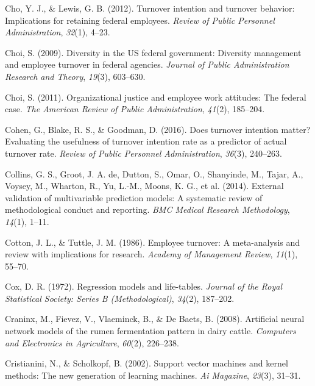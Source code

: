 \documentclass[
  man]{apa7}
\newlength{\cslhangindent}
\newlength{\cslentryspacingunit} %
\newenvironment{CSLReferences}[2] %
 {%
  \setlength{\parindent}{0pt}
  \ifodd #1
  \let\oldpar\par
  \def\par{\hangindent=\cslhangindent\oldpar}
  \fi
  \setlength{\parskip}{#2\cslentryspacingunit}
 }%
 {}
\begin{document}
\begin{CSLReferences}{1}{0}
\leavevmode{}%
Cho, Y. J., \& Lewis, G. B. (2012). Turnover intention and turnover behavior: Implications for retaining federal employees. \emph{Review of Public Personnel Administration}, \emph{32}(1), 4--23.

\leavevmode{}%
Choi, S. (2009). Diversity in the US federal government: Diversity management and employee turnover in federal agencies. \emph{Journal of Public Administration Research and Theory}, \emph{19}(3), 603--630.

\leavevmode{}%
Choi, S. (2011). Organizational justice and employee work attitudes: The federal case. \emph{The American Review of Public Administration}, \emph{41}(2), 185--204.

\leavevmode{}%
Cohen, G., Blake, R. S., \& Goodman, D. (2016). Does turnover intention matter? Evaluating the usefulness of turnover intention rate as a predictor of actual turnover rate. \emph{Review of Public Personnel Administration}, \emph{36}(3), 240--263.

\leavevmode{}%
Collins, G. S., Groot, J. A. de, Dutton, S., Omar, O., Shanyinde, M., Tajar, A., Voysey, M., Wharton, R., Yu, L.-M., Moons, K. G., et al. (2014). External validation of multivariable prediction models: A systematic review of methodological conduct and reporting. \emph{BMC Medical Research Methodology}, \emph{14}(1), 1--11.

\leavevmode{}%
Cotton, J. L., \& Tuttle, J. M. (1986). Employee turnover: A meta-analysis and review with implications for research. \emph{Academy of Management Review}, \emph{11}(1), 55--70.

\leavevmode{}%
Cox, D. R. (1972). Regression models and life-tables. \emph{Journal of the Royal Statistical Society: Series B (Methodological)}, \emph{34}(2), 187--202.

\leavevmode{}%
Craninx, M., Fievez, V., Vlaeminck, B., \& De Baets, B. (2008). Artificial neural network models of the rumen fermentation pattern in dairy cattle. \emph{Computers and Electronics in Agriculture}, \emph{60}(2), 226--238.

\leavevmode{}%
Cristianini, N., \& Scholkopf, B. (2002). Support vector machines and kernel methods: The new generation of learning machines. \emph{Ai Magazine}, \emph{23}(3), 31--31.


\end{CSLReferences}
\end{document}
